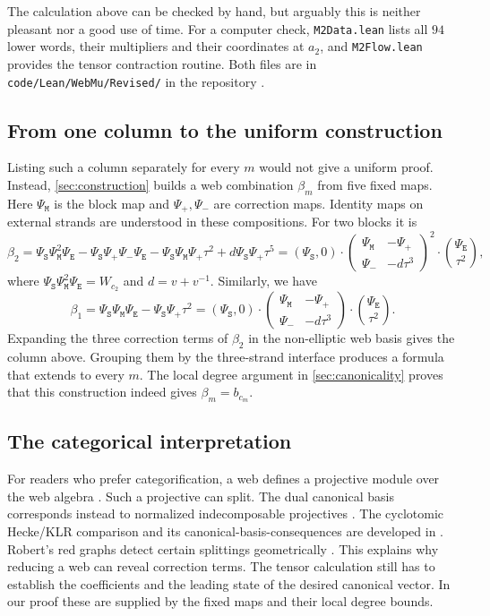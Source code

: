 \documentclass[a4paper,11pt]{amsart}
\newcommand{\wordstart}{\mathtt{S}}
\newcommand{\wordmiddle}{\mathtt{M}}
\newcommand{\wordend}{\mathtt{E}}
\newcommand{\startmap}{{\Psi}_{{\wordstart}}}
\newcommand{\middlemap}{{\Psi}_{{\wordmiddle}}}
\newcommand{\finishmap}{{\Psi}_{{\wordend}}}
\newcommand{\createmap}{{\Psi}_+}
\newcommand{\removemap}{{\Psi}_-}
\newcommand{\repo}[1]{\nolinkurl{#1}}
\newcommand{\tpar}{v}
\numberwithin{equation}{subsection}
\theoremstyle{plain}
\theoremstyle{definition}
\theoremstyle{remark}
\begin{document}
\begin{remark}
The calculation above can be checked by hand, but arguably this is
neither pleasant nor a good use of time.
For a computer check, \texttt{M2Data.lean} lists all $94$ lower words,
their multipliers and their coordinates at $a_2$, and
\texttt{M2Flow.lean} provides the tensor contraction routine.
Both files are in \repo{code/Lean/WebMu/Revised/}
in the repository \cite{GoLaTuVa-mu-code}.
\end{remark}

\subsection{From one column to the uniform construction}

Listing such a column separately for every $m$ would not give a
uniform proof. Instead, \autoref{sec:construction} builds a web
combination $\beta_m$ from five fixed maps.
Here $\middlemap$ is the block map and $\createmap,\removemap$ are correction maps.
Identity maps on external strands are understood in these compositions.
For two blocks it is
\[
\beta_2=\startmap\middlemap^2\finishmap-\startmap\createmap\removemap\finishmap-\startmap\middlemap\createmap\tau^2+d\startmap\createmap\tau^5=(\startmap,0)\cdot\begin{pmatrix}\middlemap&-\createmap\\\removemap&-d\tau^3\end{pmatrix}^2\cdot\binom{\finishmap}{\tau^2},
\]
where $\startmap\middlemap^2\finishmap=W_{c_2}$ and $d=\tpar+\tpar^{-1}$. Similarly, we have
\[
\beta_1=\startmap\middlemap\finishmap-\startmap\createmap\tau^2=(\startmap,0)\cdot\begin{pmatrix}\middlemap&-\createmap\\\removemap&-d\tau^3\end{pmatrix}\cdot\binom{\finishmap}{\tau^2}.
\]
Expanding the three correction
terms of $\beta_2$ in the non-elliptic web basis gives the column above. Grouping
them by the three-strand interface produces a formula that extends
to every $m$. The local degree argument in \autoref{sec:canonicality}
proves that this construction indeed gives $\beta_m=b_{c_m}$.

\subsection{The categorical interpretation}

For readers who prefer categorification, a web defines a projective
module over the web algebra \cite{MPT}. Such a projective can split.
The dual canonical basis corresponds instead to normalized
indecomposable projectives \cite[Corollary 7.9]{MackaayDual}. The
cyclotomic Hecke/KLR comparison and its canonical-basis-consequences
are developed in \cite{BrundanKleshchevBlocks,BrundanKleshchev}.
Robert's red graphs detect certain splittings geometrically
\cite{RobertFamily,RobertCharacterization}. This explains why reducing
a web can reveal correction terms. The tensor calculation still has
to establish the coefficients and the leading state of the desired
canonical vector. In our proof these are supplied by the fixed maps
and their local degree bounds.
\end{document}
